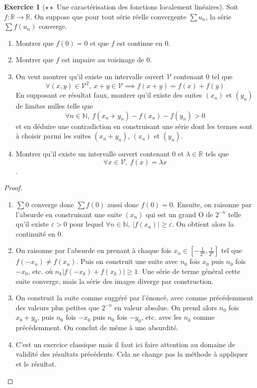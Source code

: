 \documentclass[french]{book}
\newcommand{\N}{\mathbb{N}}
\newcommand{\R}{\mathbb{R}}
\theoremstyle{definition}
\newtheorem{ex}{Exercice}[chapter]
\theoremstyle{theorem}
\theoremstyle{remark}
\begin{document}
\begin{ex}[$\star\star$ Une caractérisation des fonctions localement linéaires]
	Soit $f:\R\to\R$. On suppose que pour tout série réelle convergente $\sum u_n$, la série $\sum f(u_n)$ converge.
	\begin{enumerate}
		\item Montrer que $f(0)=0$ et que $f$ est continue en $0$.
		\item Montrer que $f$ est impaire au voisinage de $0$.
		\item On veut montrer qu'il existe un intervalle ouvert $\mathcal{V}$ contenant $0$ tel que $$\forall (x,y)\in\mathcal{V}^2,\ x+y\in\mathcal{V}\implies f(x+y)=f(x)+f(y)$$ En supposant ce résultat faux, montrer qu'il existe des suites $(x_n)$ et $(y_n)$ de limites nulles telle que $$\forall n\in\N,\ f(x_n+y_n)-f(x_n)-f(y_n)>0$$ et en déduire une contradiction en construisant une série dont les termes sont à choisir parmi les suites $(x_n+y_n)$, $(x_n)$ et $(y_n)$.
		\item Montrer qu'il existe un intervalle ouvert contenant $0$ et $\lambda\in\R$ tels que $$\forall x\in\mathcal{V},\ f(x)=\lambda x$$.
	\end{enumerate}
\end{ex}

\begin{proof}
	\begin{enumerate}
		\item $\sum 0$ converge donc $\sum f(0)$ aussi donc $f(0)=0$. Ensuite, on raisonne par l'absurde en construisant une suite $(x_n)$ qui est un grand O de $2^{-n}$ telle qu'il existe $\varepsilon>0$ pour lequel $\forall n\in\N,\ \lvert f(x_n)\rvert\geqslant\varepsilon$. On obtient alors la continuité en $0$.
		\item On raisonne par l'absurde en prenant à chaque fois $x_n\in\displaystyle\left[-\frac{1}{2^n},\frac{1}{2^n}\right]$ tel que $f(-x_n)\ne f(x_n)$. Puis on construit une suite avec $n_0$ fois $x_0$ puis $n_0$ fois $-x_0$, etc. où $n_k\lvert f(-x_k)+f(x_k)\rvert\geqslant1$. Une série de terme général cette suite converge, mais la série des images diverge par construction.
		\item On construit la suite comme suggéré par l'énoncé, avec comme précédemment des valeurs plus petites que $2^{-n}$ en valeur absolue. On prend alors $n_0$ fois $x_0+y_0$, puis $n_0$ fois $-x_0$ puis $n_0$ fois $-y_0$, etc. avec les $n_k$ comme précédemment. On conclut de même à une absurdité.
		\item C'est un exercice classique mais il faut ici faire attention au domaine de validité des résultats précédents. Cela ne change pas la méthode à appliquer et le résultat.
	\end{enumerate}
\end{proof}
\end{document}
